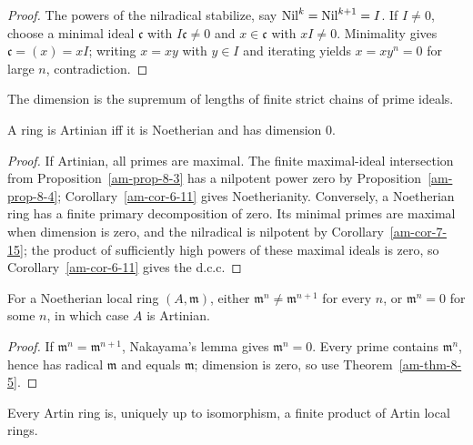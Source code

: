 \begin{proof}
The powers of the nilradical stabilize, say $\operatorname{Nil}^k=\operatorname{Nil}^{k+1}=I$.  If
$I\ne0$, choose a minimal ideal $\mathfrak{c}$ with $I\mathfrak{c}\ne0$ and $x\in\mathfrak{c}$
with $xI\ne0$.  Minimality gives $\mathfrak{c}=(x)=xI$; writing $x=xy$ with
$y\in I$ and iterating yields $x=xy^n=0$ for large $n$, contradiction.
\end{proof}
\begin{definition}
\label{am-def-ring-dimension}
\uses{}
The dimension is the supremum of lengths of finite strict chains of prime ideals.
\end{definition}
\begin{theorem}
\label{am-thm-8-5}
\uses{}
A ring is Artinian iff it is Noetherian and has dimension $0$.
\end{theorem}
\begin{proof}
If Artinian, all primes are maximal.  The finite maximal-ideal intersection
from Proposition~\ref{am-prop-8-3} has a nilpotent power zero by
Proposition~\ref{am-prop-8-4}; Corollary~\ref{am-cor-6-11} gives Noetherianity.
Conversely, a Noetherian ring has a finite primary decomposition of zero.  Its
minimal primes are maximal when dimension is zero, and the nilradical is
nilpotent by Corollary~\ref{am-cor-7-15}; the product of sufficiently high powers
of these maximal ideals is zero, so Corollary~\ref{am-cor-6-11} gives the d.c.c.
\end{proof}
\begin{proposition}
\label{am-prop-8-6}
\uses{}
For a Noetherian local ring $(A,\mathfrak{m})$, either $\mathfrak{m}^n\ne\mathfrak{m}^{n+1}$ for every $n$,
or $\mathfrak{m}^n=0$ for some $n$, in which case $A$ is Artinian.
\end{proposition}
\begin{proof}
If $\mathfrak{m}^n=\mathfrak{m}^{n+1}$, Nakayama's lemma gives $\mathfrak{m}^n=0$.  Every prime contains
$\mathfrak{m}^n$, hence has radical $\mathfrak{m}$ and equals $\mathfrak{m}$; dimension is zero, so use
Theorem~\ref{am-thm-8-5}.
\end{proof}
\begin{theorem}
\label{am-thm-8-7}
\uses{}
Every Artin ring is, uniquely up to isomorphism, a finite product of Artin local
rings.
\end{theorem}
